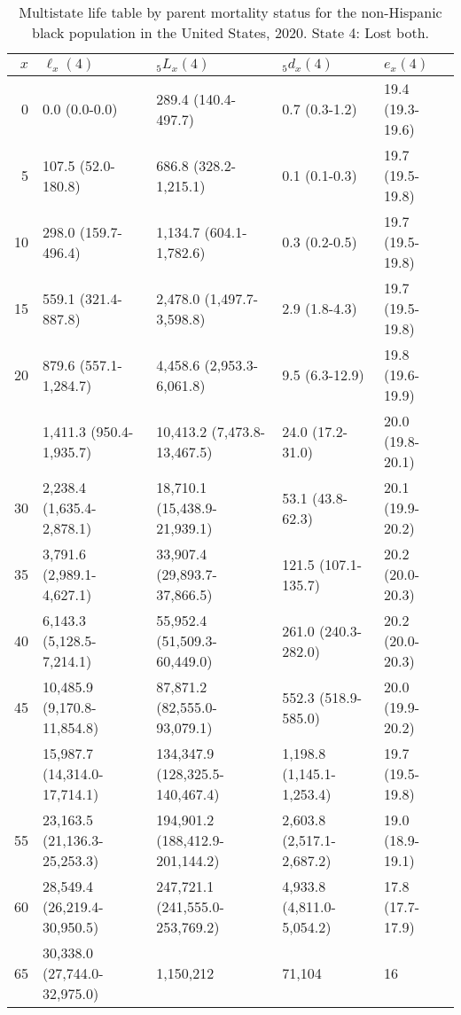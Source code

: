 \begin{table}

\caption{Multistate life table by parent mortality status for the non-Hispanic black population in the United States, 2020. State 4: Lost both.}
\centering
\begin{tabular}[t]{rllll}
\toprule
$x$ & $\ell_x(4)$ & ${}_5 L_x(4)$ & ${}_5 d_x(4)$ & $e_x(4)$\\
\midrule
0 & 0.0 (0.0-0.0) & 289.4 (140.4-497.7) & 0.7 (0.3-1.2) & 19.4 (19.3-19.6)\\
5 & 107.5 (52.0-180.8) & 686.8 (328.2-1,215.1) & 0.1 (0.1-0.3) & 19.7 (19.5-19.8)\\
10 & 298.0 (159.7-496.4) & 1,134.7 (604.1-1,782.6) & 0.3 (0.2-0.5) & 19.7 (19.5-19.8)\\
15 & 559.1 (321.4-887.8) & 2,478.0 (1,497.7-3,598.8) & 2.9 (1.8-4.3) & 19.7 (19.5-19.8)\\
20 & 879.6 (557.1-1,284.7) & 4,458.6 (2,953.3-6,061.8) & 9.5 (6.3-12.9) & 19.8 (19.6-19.9)\\
\addlinespace
25 & 1,411.3 (950.4-1,935.7) & 10,413.2 (7,473.8-13,467.5) & 24.0 (17.2-31.0) & 20.0 (19.8-20.1)\\
30 & 2,238.4 (1,635.4-2,878.1) & 18,710.1 (15,438.9-21,939.1) & 53.1 (43.8-62.3) & 20.1 (19.9-20.2)\\
35 & 3,791.6 (2,989.1-4,627.1) & 33,907.4 (29,893.7-37,866.5) & 121.5 (107.1-135.7) & 20.2 (20.0-20.3)\\
40 & 6,143.3 (5,128.5-7,214.1) & 55,952.4 (51,509.3-60,449.0) & 261.0 (240.3-282.0) & 20.2 (20.0-20.3)\\
45 & 10,485.9 (9,170.8-11,854.8) & 87,871.2 (82,555.0-93,079.1) & 552.3 (518.9-585.0) & 20.0 (19.9-20.2)\\
\addlinespace
50 & 15,987.7 (14,314.0-17,714.1) & 134,347.9 (128,325.5-140,467.4) & 1,198.8 (1,145.1-1,253.4) & 19.7 (19.5-19.8)\\
55 & 23,163.5 (21,136.3-25,253.3) & 194,901.2 (188,412.9-201,144.2) & 2,603.8 (2,517.1-2,687.2) & 19.0 (18.9-19.1)\\
60 & 28,549.4 (26,219.4-30,950.5) & 247,721.1 (241,555.0-253,769.2) & 4,933.8 (4,811.0-5,054.2) & 17.8 (17.7-17.9)\\
65 & 30,338.0 (27,744.0-32,975.0) & 1,150,212 & 71,104 & 16\\
\bottomrule
\end{tabular}
\end{table}